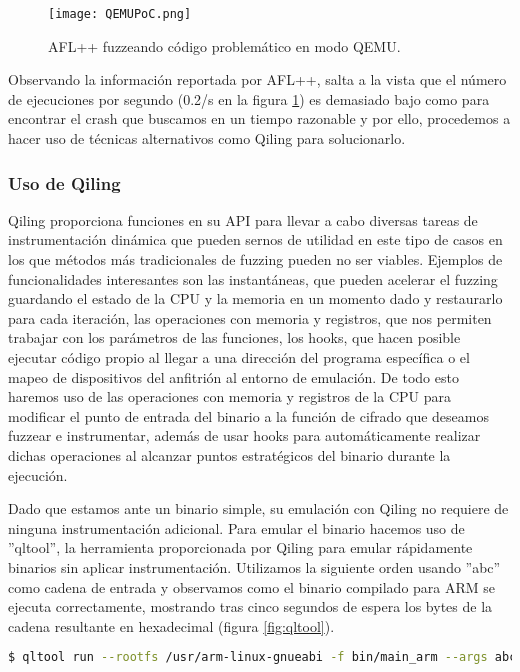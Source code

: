 \begin{figure}[H]
    \centering
    \texttt{[image: QEMUPoC.png]}
    \caption{AFL++ fuzzeando código problemático en modo QEMU.}
    \label{fig:QEMUPoC}
\end{figure}

Observando la información reportada por AFL++, salta a la vista que el número de ejecuciones por segundo (0.2/s en la figura \ref{fig:QEMUPoC}) es demasiado bajo como para encontrar 
el crash que buscamos en un tiempo razonable y por ello, procedemos a hacer uso de técnicas alternativos como Qiling para solucionarlo.

\subsubsection{Uso de Qiling}
Qiling proporciona funciones en su API para llevar a cabo diversas tareas de instrumentación dinámica que pueden sernos de utilidad en este 
tipo de casos en los que métodos más tradicionales de fuzzing pueden no ser viables. Ejemplos de funcionalidades interesantes son las instantáneas,
que pueden acelerar el fuzzing guardando el estado de la CPU y la memoria en un momento dado y restaurarlo para cada iteración, las operaciones 
con memoria y registros, que nos permiten trabajar con los parámetros de las funciones, los hooks, que hacen posible ejecutar código propio al 
llegar a una dirección del programa específica o el mapeo de dispositivos del anfitrión al entorno de emulación. De todo esto haremos uso de las 
operaciones con memoria y registros de la CPU para modificar el punto de entrada del binario a la función de cifrado que deseamos fuzzear e 
instrumentar, además de usar hooks para automáticamente realizar dichas operaciones al alcanzar puntos estratégicos del binario durante la 
ejecución.\bigskip

Dado que estamos ante un binario simple, su emulación con Qiling no requiere de ninguna instrumentación adicional. Para emular el binario 
hacemos uso de ''qltool'', la herramienta proporcionada por Qiling para emular rápidamente binarios sin aplicar instrumentación. Utilizamos la 
siguiente orden usando ''abc'' como cadena de entrada y observamos como el binario compilado para ARM se ejecuta correctamente, mostrando tras cinco segundos de espera los
bytes de la cadena resultante en hexadecimal (figura \ref{fig:qltool}).

\begin{lstlisting}[language=bash]
    $ qltool run --rootfs /usr/arm-linux-gnueabi -f bin/main_arm --args abc
\end{lstlisting}

